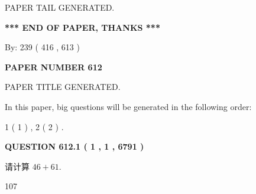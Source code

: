 \documentclass{ctexart}
\begin{document}
   
   
   
   
   
 \vspace{0.2in}
 
   
   
\vspace{2.0in} PAPER TAIL GENERATED.
   
   
   
   
\vspace{1.0in} 
{\textbf{\large{ *** END OF PAPER, THANKS *** }}} 
   
   
\hspace{1.0in} By: 
 239 ( 416 ,  613 )
   
   
   
   
\newpage 
\setcounter{page}{ 
   612001 } 
   
   
   
   
 {\textbf{ \Large{ PAPER NUMBER  612  }}}
   
   
\vspace{0.2in}
   
   
   
   
   
   
   
   
 \vspace{0.2in}
 
 
 
 
   
   
 PAPER TITLE GENERATED.
   
   
   
\vspace{0.2in}
   
In this paper, big questions will be generated in the following order: 
   
   
   1 ( 1 )
 ,
   2 ( 2 )
 .
  
\vspace{0.2in}
  
{\textbf{\Large{QUESTION
612.1 
 ( 1 , 1 , 6791 )
}}}
  
  
 
请计算 $ %
46 +  %
61 $.
 
 
 
\noindent{}
 
 

107
 
 
\noindent{}
 
\end{document}
